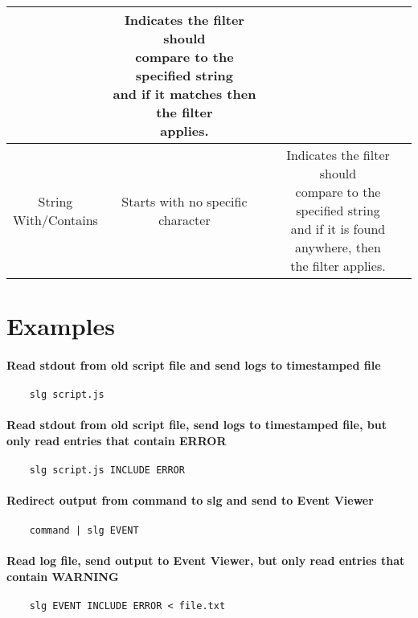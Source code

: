 \documentclass[11pt]{article}
\begin{document}
\begin{center}
\begin{tabular}{ | c | c | c | }
    & \makecell{ Indicates the filter should \\ compare to the specified string \\ and if it matches then the filter \\ applies. } \\
\hline
    \makecell { String \\ With/Contains }
    & \makecell { Starts with no specific \\ character }
    & \makecell{ Indicates the filter should \\ compare to the specified string \\ and if it is found anywhere, then \\ the filter applies. } \\
\hline
\end{tabular}
\end{center}

\section{Examples}
\paragraph{Read stdout from old script file and send logs to timestamped file}
\begin{verbatim}
    slg script.js
\end{verbatim}
\paragraph{Read stdout from old script file, send logs to timestamped file, but only read entries that contain ERROR}
\begin{verbatim}
    slg script.js INCLUDE ERROR
\end{verbatim}
\paragraph{Redirect output from command to slg and send to Event Viewer}
\begin{verbatim}
    command | slg EVENT
\end{verbatim}
\paragraph{Read log file, send output to Event Viewer, but only read entries that contain WARNING}
\begin{verbatim}
    slg EVENT INCLUDE ERROR < file.txt
\end{verbatim}
\end{document}
